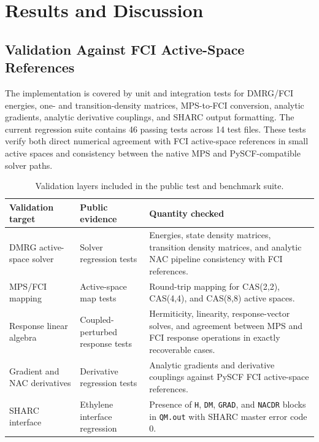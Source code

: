 \documentclass[journal=jctcce,manuscript=article]{achemso}
\begin{document}
\section{Results and Discussion}

\subsection{Validation Against FCI Active-Space References}

The implementation is covered by unit and integration tests for DMRG/FCI
energies, one- and transition-density matrices, MPS-to-FCI conversion,
analytic gradients, analytic derivative couplings, and SHARC output
formatting.  The current regression suite contains 46 passing tests across
14 test files.  These tests verify both direct numerical agreement with FCI
active-space references in small active spaces and consistency between the
native MPS and PySCF-compatible solver paths.

\begin{table}[t]
\centering
\scriptsize
\caption{Validation layers included in the public test and benchmark suite.}
\label{tab:validation}
\begin{tabular}{p{}p{}p{}}
\toprule
Validation target & Public evidence & Quantity checked \\
\midrule
DMRG active-space solver
& Solver regression tests
& Energies, state density matrices, transition density matrices, and analytic
NAC pipeline consistency with FCI references. \\
MPS/FCI mapping
& Active-space map tests
& Round-trip mapping for CAS(2,2), CAS(4,4), and CAS(8,8) active spaces. \\
Response linear algebra
& Coupled-perturbed response tests
& Hermiticity, linearity, response-vector solves, and agreement between MPS
and FCI response operations in exactly recoverable cases. \\
Gradient and NAC derivatives
& Derivative regression tests
& Analytic gradients and derivative couplings against PySCF FCI active-space
references. \\
SHARC interface
& Ethylene interface regression
& Presence of \texttt{H}, \texttt{DM}, \texttt{GRAD}, and \texttt{NACDR}
blocks in \texttt{QM.out} with SHARC master error code 0. \\
\bottomrule
\end{tabular}
\end{table}
\end{document}

